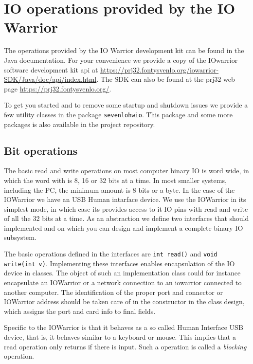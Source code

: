 \section{IO operations provided  by the IO Warrior}

The operations provided by the IO Warrior development kit can be found
in the Java documentation. For your convenience we provide a copy of
the IOwarrior software development kit  api at
\url{https://prj32.fontysvenlo.org/iowarrior-SDK/Java/doc/api/index.html}. 
The SDK can also be found at the prj32 web page \url{https://prj32.fontysvenlo.org/}.

To get you started and to remove some startup and shutdown issues we
provide a few utility classes in the package \lstinline{sevenlohwio}.
This package and some more packages is also available in the
project repository.


\subsection{Bit operations}
\lstset{language=Java}
The basic read and write operations on most computer binary IO is word
wide, in which the word with is 8, 16 or 32 bits at a time.
In most smaller systems, including the PC, the minimum amount is 8
bits or a byte. In the case of the IOWarrior we have an USB Human
intarface device. We use the IOWarrior in its simplest mode, in which
case its provides access to it IO pins with read and write of all the
32 bits at a time.
As an abstraction we define two interfaces that should implemented and
on which you can design and implement a complete binary IO subsystem.

The basic operations defined in the interfaces are 
\lstinline{int read()} and \lstinline{void write(int v)}. Implementing these
interfaces enables encapsulation of the IO device in classes. The
object of such an implementation class could for instance encapsulate
an IOWarrior or a network connection to an iowarrior connected to
another computer. The identification of the proper port and connector or
IOWarrior address should be taken care of in the constructor in the
class design, which assigns the port and card info to final fields.

Specific to the IOWarrior is that it behaves as a so called Human
Interface USB device, that is, it behaves similar to a keyboard or
mouse. This implies that a read operation only returns if there is
input. Such a operation is called a \textit{blocking} operation. 

